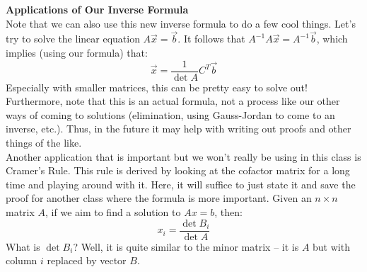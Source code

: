 \documentclass[12pt]{amsart}
\begin{document}
\textbf{Applications of Our Inverse Formula}\\
Note that we can also use this new inverse formula to do a few cool things. Let's try to solve the linear equation $A\vec{x} = \vec{b}$. It follows that $A^{-1}A\vec{x}=A^{-1}\vec{b}$, which implies (using our formula) that:
\[\vec{x} = \frac{1}{\det A}C^T \vec{b}\]
Especially with smaller matrices, this can be pretty easy to solve out! Furthermore, note that this is an actual formula, not a process like our other ways of coming to solutions (elimination, using Gauss-Jordan to come to an inverse, etc.). Thus, in the future it may help with writing out proofs and other things of the like.\\
Another application that is important but we won't really be using in this class is Cramer's Rule. This rule is derived by looking at the cofactor matrix for a long time and playing around with it. Here, it will suffice to just state it and save the proof for another class where the formula is more important. Given an $n \times n$ matrix $A$, if we aim to find a solution to $Ax=b$, then:
\[x_i = \frac{\det B_i}{\det A}\]
What is $\det B_i$? Well, it is quite similar to the minor matrix -- it is $A$ but with column $i$ replaced by vector $B$.
\end{document}
